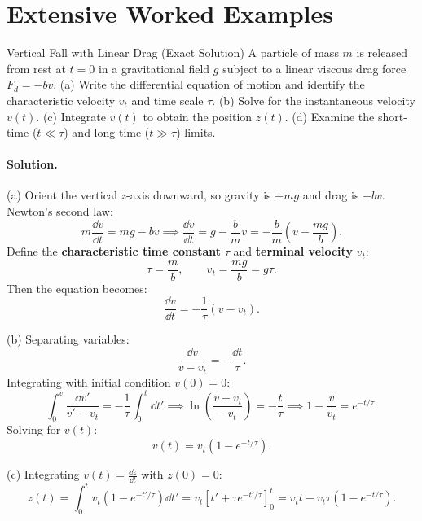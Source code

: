 \section{Extensive Worked Examples}

\begin{workedexample}{Vertical Fall with Linear Drag (Exact Solution)}
A particle of mass $m$ is released from rest at $t = 0$ in a gravitational field $g$ subject to a linear viscous drag force $F_d = -b v$.
(a) Write the differential equation of motion and identify the characteristic velocity $v_t$ and time scale $\tau$.
(b) Solve for the instantaneous velocity $v(t)$.
(c) Integrate $v(t)$ to obtain the position $z(t)$.
(d) Examine the short-time ($t \ll \tau$) and long-time ($t \gg \tau$) limits.

\paragraph{Solution.}

(a) Orient the vertical $z$-axis downward, so gravity is $+mg$ and drag is $-bv$.
Newton's second law:
\[
m\frac{\dd v}{\dd t} = mg - bv \implies \frac{\dd v}{\dd t} = g - \frac{b}{m}v = -\frac{b}{m}\left(v - \frac{mg}{b}\right).
\]
Define the \textbf{characteristic time constant} $\tau$ and \textbf{terminal velocity} $v_t$:
\[
\boxed{\tau = \frac{m}{b}}, \qquad \boxed{v_t = \frac{mg}{b} = g\tau.}
\]
Then the equation becomes:
\[
\frac{\dd v}{\dd t} = -\frac{1}{\tau}(v - v_t).
\]

(b) Separating variables:
\[
\frac{\dd v}{v - v_t} = -\frac{\dd t}{\tau}.
\]
Integrating with initial condition $v(0) = 0$:
\[
\int_0^v \frac{\dd v'}{v' - v_t} = -\frac{1}{\tau}\int_0^t \dd t' \implies \ln\left(\frac{v - v_t}{-v_t}\right) = -\frac{t}{\tau} \implies 1 - \frac{v}{v_t} = e^{-t/\tau}.
\]
Solving for $v(t)$:
\[
\boxed{v(t) = v_t\left(1 - e^{-t/\tau}\right).}
\]

(c) Integrating $v(t) = \frac{\dd z}{\dd t}$ with $z(0) = 0$:
\[
z(t) = \int_0^t v_t\left(1 - e^{-t'/\tau}\right)\dd t' = v_t\left[ t' + \tau e^{-t'/\tau} \right]_0^t = \boxed{v_t t - v_t\tau\left(1 - e^{-t/\tau}\right).}
\]


\end{workedexample}

